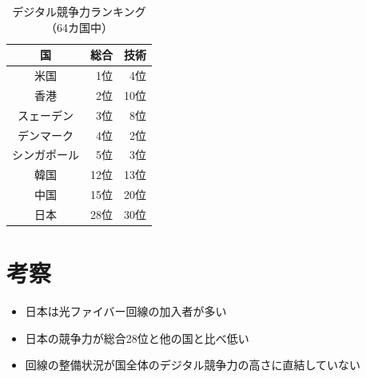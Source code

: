 \documentclass[a4paper,11pt,dvipdfmx]{ujarticle}
\begin{document}
\begin{table}[htbp]
    \centering
    \caption{デジタル競争力ランキング（64カ国中）}
    \label{tbl:デジタル}

    \begin{tabular}{|c|r|r|}\hline
        国 & 総合 & 技術 \\
        \hline
        米国 & 1位 & 4位 \\
        \hline
        香港 & 2位 & 10位 \\
        \hline
        スェーデン & 3位 & 8位 \\
        \hline
        デンマーク & 4位 & 2位 \\
        \hline
        シンガポール & 5位 & 3位 \\
        \hline
        \hline
        韓国 & 12位 & 13位 \\
        \hline 
        中国 & 15位 & 20位 \\
        \hline
        \hline
        日本 & 28位 & 30位 \\
        \hline
    \end{tabular}
\end{table}

\section{考察}
\begin{itemize}
    \item 日本は光ファイバー回線の加入者が多い
    \item 日本の競争力が総合28位と他の国と比べ低い
    \item 回線の整備状況が国全体のデジタル競争力の高さに直結していない
\end{itemize}



\end{document}

